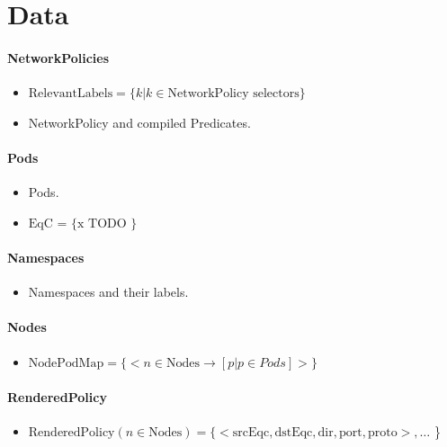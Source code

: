 \documentclass[11pt]{article}
\begin{document}
\section{Data}

\paragraph{NetworkPolicies}

\begin{itemize}
    \item $\text{RelevantLabels} = 
        \{ k | k \in \text{NetworkPolicy selectors} \}$
    \item NetworkPolicy and compiled Predicates.
\end{itemize}

\paragraph{Pods}

\begin{itemize}
    \item Pods.
    \item $\text{EqC = 
    \{
        x TODO
    \}}$
\end{itemize}

\paragraph{Namespaces}

\begin{itemize}
    \item Namespaces and their labels.
\end{itemize}

\paragraph{Nodes}
\begin{itemize}

    \item $\text{NodePodMap} =
        \{ 
            < n \in \text{Nodes} \rightarrow [ p | p \in Pods ] > 
        \}$
\end{itemize}

\paragraph{RenderedPolicy}

\begin{itemize}
    \item $\text{RenderedPolicy}(n \in \text{Nodes}) = 
        \{ <\text{srcEqc}, \text{dstEqc}, \text{dir}, \text{port}, \text{proto}>,
        \ldots$ \}
\end{itemize}
\end{document}
